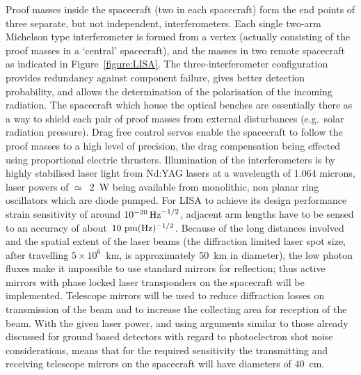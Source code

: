 \documentclass{article}
\begin{document}
Proof masses inside the spacecraft (two in each spacecraft) form the end points
of three separate, but not independent, interferometers. Each single two-arm
Michelson type interferometer is formed from a vertex (actually consisting of
the proof masses in a `central' spacecraft), and the masses in two remote
spacecraft as indicated in Figure~\ref{figure:LISA}. The three-interferometer
configuration provides redundancy against component failure, gives better
detection probability, and allows the determination of the polarisation of the
incoming radiation. The spacecraft which house the optical benches are
essentially there as a way to shield each pair of proof masses from external
disturbances (e.g.~solar radiation pressure). Drag free control servos enable
the spacecraft to follow the proof masses to a high level of precision, the drag
compensation being effected using proportional electric thrusters. Illumination
of the interferometers is by highly stabilised laser light from Nd:YAG lasers at
a wavelength of 1.064 microns, laser powers of $\simeq$~2~W being available from
monolithic, non planar ring oscillators which are diode pumped.  For LISA to
achieve its design performance strain sensitivity of around $10^{-20}\,{\rm
Hz}^{-1/2}$, adjacent arm lengths have to be sensed to an accuracy of about $10
{\rm \ pm}(\rm Hz)^{-1/2}$. Because of the long distances involved and the
spatial extent of the laser beams (the diffraction limited laser spot size,
after travelling $5\times10^{6}$~km, is approximately 50~km in diameter), the
low photon fluxes make it impossible to use standard mirrors for reflection;
thus active mirrors with phase locked laser transponders on the spacecraft will
be implemented. Telescope mirrors will be used to reduce diffraction losses on
transmission of the beam and to increase the collecting area for reception of
the beam. With the given laser power, and using arguments similar to those
already discussed for ground based detectors with regard to photoelectron shot
noise considerations, means that for the required sensitivity the transmitting
and receiving telescope mirrors on the spacecraft will have diameters of 40~cm.

\end{document}

